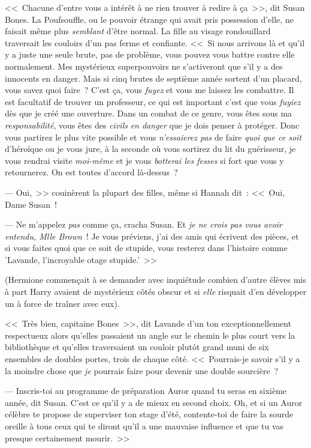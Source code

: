 <<~Chacune d'entre vous a intérêt à ne rien trouver à redire à ça~>>, dit Susan Bones. La Poufsouffle, ou le pouvoir étrange qui avait pris possession d'elle, ne faisait même plus \emph{semblant} d'être normal. La fille au visage rondouillard traversait les couloirs d'un pas ferme et confiante. <<~Si nous arrivons là et qu'il y a juste une seule brute, pas de problème, vous pouvez vous battre contre elle normalement. Mes mystérieux superpouvoirs ne s'activeront que s'il y a des innocents en danger. Mais si cinq brutes de septième année sortent d'un placard, vous savez quoi faire~? C'est ça, vous \emph{fuyez} et vous me laissez les combattre. Il est facultatif de trouver un professeur, ce qui est important c'est que vous \emph{fuyiez} dès que je créé une ouverture. Dans un combat de ce genre, vous êtes sous ma \emph{responsabilité}, vous êtes des \emph{civils} \emph{en danger} que je dois penser à protéger. Donc vous partirez le plus vite possible et vous \emph{n'essaierez pas} de faire \emph{quoi que ce soit} d'héroïque ou je vous jure, à la seconde où vous sortirez du lit du guérisseur, je vous rendrai visite \emph{moi-même} et je vous \emph{botterai les fesses} si fort que vous y retournerez. On est toutes d'accord là-dessus~?

--- Oui,~>> couinèrent la plupart des filles, même si Hannah dit~: <<~Oui, Dame Susan~!

--- Ne m'appelez \emph{pas} comme ça, cracha Susan. Et \emph{je ne crois pas vous avoir entendu, Mlle Brown}~! Je vous préviens, j'ai des amis qui écrivent des pièces, et si vous faites quoi que ce soit de stupide, vous resterez dans l'histoire comme 'Lavande, l'incroyable otage stupide.'~>>

(Hermione commençait à se demander avec inquiétude combien d'autre élèves mis à part Harry avaient de mystérieux côtés obscur et si \emph{elle} risquait d'en développer un à force de traîner avec eux).

<<~Très bien, capitaine Bones~>>, dit Lavande d'un ton exceptionnellement respectueux alors qu'elles passaient un angle sur le chemin le plus court vers la bibliothèque et qu'elles traversaient un couloir plutôt grand muni de six ensembles de doubles portes, trois de chaque côté. <<~Pourrais-je savoir s'il y a la moindre chose que \emph{je} pourrais faire pour devenir une double sourcière~?

--- Inscris-toi au programme de préparation Auror quand tu seras en sixième année, dit Susan. C'est ce qu'il y a de mieux en second choix. Oh, et si un Auror célèbre te propose de superviser ton stage d'été, contente-toi de faire la sourde oreille à tous ceux qui te diront qu'il a une mauvaise influence et que tu vas presque certainement mourir.~>>

